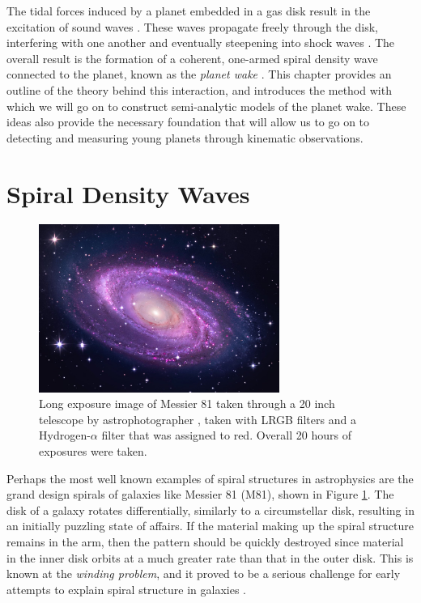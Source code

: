The tidal forces induced by a planet embedded in a gas disk result in the excitation of sound waves \citep{goldreich1980}.
These waves propagate freely through the disk, interfering with one another and eventually steepening into shock waves \citep{goodman2001}.
The overall result is the formation of a coherent, one-armed spiral density wave connected to the planet, known as the \textit{planet wake} \citep{ogilvie2002}. 
This chapter provides an outline of the theory behind this interaction, and introduces the method with which we will go on to construct semi-analytic models of the planet wake.
These ideas also provide the necessary foundation that will allow us to go on to detecting and measuring young planets through kinematic observations.

\section{Spiral Density Waves}

\begin{figure}
    \centering
    \includegraphics[width = 0.7\textwidth]{figures/M81.jpeg}
    \caption{Long exposure image of Messier 81 taken through a 20 inch telescope by astrophotographer \citet{adler2015}, taken with LRGB filters and a Hydrogen-$\alpha$ filter that was assigned to red. Overall 20 hours of exposures were taken.}
    \label{fig:M81}
\end{figure}

Perhaps the most well known examples of spiral structures in astrophysics are the grand design spirals of galaxies like Messier 81 (M81), shown in Figure \ref{fig:M81}.
The disk of a galaxy rotates differentially, similarly to a circumstellar disk, resulting in an initially puzzling state of affairs.
If the material making up the spiral structure remains in the arm, then the pattern should be quickly destroyed since material in the inner disk orbits at a much greater rate than that in the outer disk.
This is known at the \textit{winding problem}, and it proved to be a serious challenge for early attempts to explain spiral structure in galaxies \citep{wilczynski1896,oort1962}.


